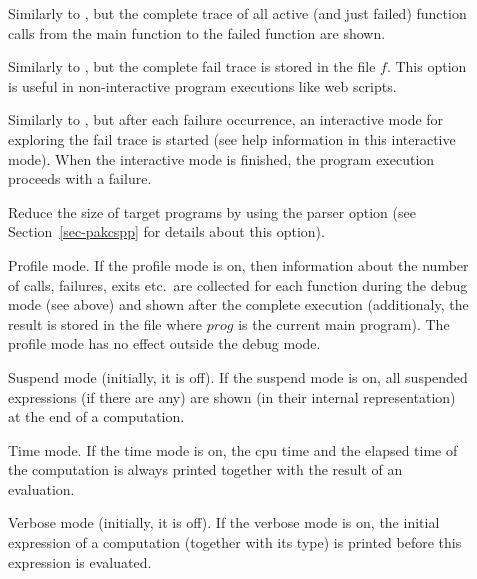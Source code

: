 \begin{description}
\begin{description}
\item[]
Similarly to , but the complete trace
of all active (and just failed) function calls from the main function
to the failed function are shown.

\item[]
Similarly to , but the complete fail trace
is stored in the file $f$. This option is useful in non-interactive
program executions like web scripts.

\item[]
Similarly to , but after each failure occurrence,
an interactive mode for exploring the fail trace is started
(see help information in this interactive mode).
When the interactive mode is finished, the program execution
proceeds with a failure.

\item[]
Reduce the size of target programs by using the
parser option 
(see Section~\ref{sec-pakcspp} for details about this option).

\item[] Profile mode.
If the profile mode is on, then information about
the number of calls, failures, exits etc.\ are collected for
each function during the debug mode (see above) and shown
after the complete execution (additionaly, the result is stored
in the file  where $prog$ is the current main program).
The profile mode has no effect outside the debug mode.


\item[] Suspend mode (initially, it is off).
If the suspend mode is on, all suspended expressions
(if there are any) are shown (in their internal representation) at the end
of a computation.

\item[] Time mode. If the time mode is on,
the cpu time and the elapsed time
of the computation is always printed together with the result
of an evaluation.

\item[] Verbose mode (initially, it is off).
If the verbose mode is on,
the initial expression of a computation (together with its type)
is printed before this expression is evaluated.


\end{description}
\end{description}
